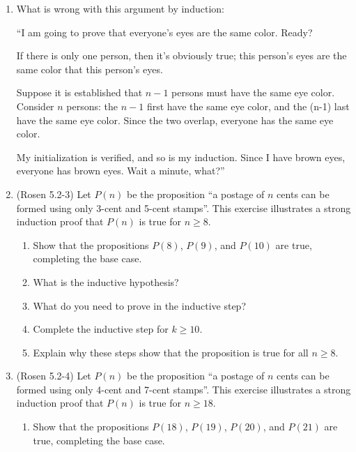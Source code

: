 \begin{enumerate}
\item \strmedium What is wrong with this argument by induction: 

``I am going to prove that everyone's eyes are the same color. Ready?

If there is only one person, then it's obviously true; this person's eyes are the same color that this person's eyes.

Suppose it is established that $n-1$ persons must have the same eye color. Consider $n$ persons: the $n-1$ first have the same eye color, and the (n-1) last have the same eye color. Since the two overlap, everyone has the same eye color.

My initialization is verified, and so is my induction. Since I have brown eyes, everyone has brown eyes. Wait a minute, what?''

\item (Rosen 5.2-3) Let $P(n)$ be the proposition ``a postage of $n$ cents can be formed using only 3-cent and 5-cent stamps''. This exercise illustrates a strong induction proof that $P(n)$ is true for $n \geq 8$.

\begin{enumerate}
\item \streasy Show that the propositions $P(8)$, $P(9)$, and $P(10)$ are true, completing the base case.

\item \streasy What is the inductive hypothesis?

\item \streasy What do you need to prove in the inductive step?

\item \strmedium Complete the inductive step for $k \geq 10$.
  
\item \streasy Explain why these steps show that the proposition is true for all $n \geq 8$.
\end{enumerate}

\item (Rosen 5.2-4) Let $P(n)$ be the proposition ``a postage of $n$ cents can be formed using only 4-cent and 7-cent stamps''. This exercise illustrates a strong induction proof that $P(n)$ is true for $n \geq 18$.

\begin{enumerate}
\item \streasy Show that the propositions $P(18)$, $P(19)$, $P(20)$, and $P(21)$ are true, completing the base case.


\end{enumerate}
\end{enumerate}
